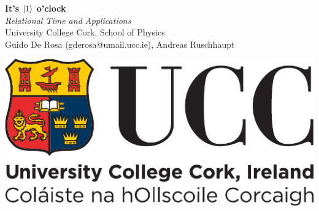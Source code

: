 \documentclass[a0,portrait]{a0poster}
\begin{document}

\begin{minipage}[c]{0.70\linewidth}
\VeryHuge\color{NavyBlue}\textbf{It's $\ket{1}$ o'clock} \color{Black}\\[0.5cm] %
\huge\textit{Relational Time and Applications}\\[1cm] %
\huge University College Cork, School of Physics\\[0.66cm] %
\Large{Guido De Rosa {\large (gderosa@umail.ucc.ie)}, Andreas Ruschhaupt}

\end{minipage}%
%
\begin{minipage}[t]{0.30\linewidth}
\includegraphics[width=18cm]{ucc_logo.pdf}\\  %
\end{minipage}

\vspace{2cm} %

\end{document}
